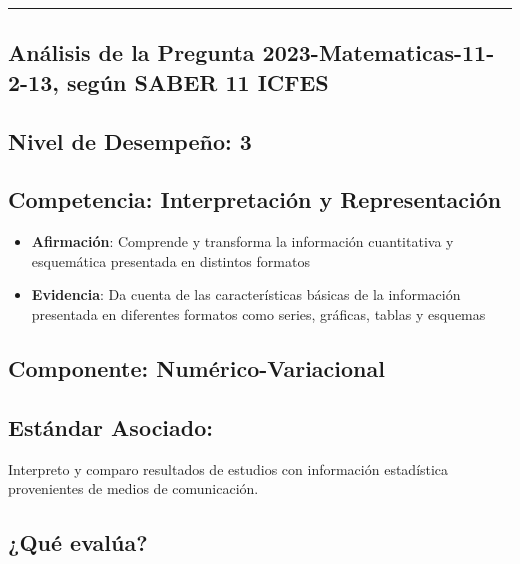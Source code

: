\documentclass[
]{article}
\providecommand{\tightlist}{%
  \setlength{\itemsep}{0pt}\setlength{\parskip}{0pt}}
\begin{document}
\begin{center}\rule{0.5\linewidth}{0.5pt}\end{center}

\subsection{Análisis de la Pregunta 2023-Matematicas-11-2-13, según
SABER 11
ICFES}\label{anuxe1lisis-de-la-pregunta-2023-matematicas-11-2-13-seguxfan-saber-11-icfes}

\subsection{Nivel de Desempeño: 3}\label{nivel-de-desempeuxf1o-3-1}

\subsection{Competencia: Interpretación y
Representación}\label{competencia-interpretaciuxf3n-y-representaciuxf3n}

\begin{itemize}
\tightlist
\item
  \textbf{Afirmación}: Comprende y transforma la información
  cuantitativa y esquemática presentada en distintos formatos
\item
  \textbf{Evidencia}: Da cuenta de las características básicas de la
  información presentada en diferentes formatos como series, gráficas,
  tablas y esquemas
\end{itemize}

\subsection{Componente:
Numérico-Variacional}\label{componente-numuxe9rico-variacional-1}

\subsection{Estándar Asociado:}\label{estuxe1ndar-asociado-3}

Interpreto y comparo resultados de estudios con información estadística
provenientes de medios de comunicación.

\subsection{¿Qué evalúa?}\label{quuxe9-evaluxfaa-4}
\end{document}
